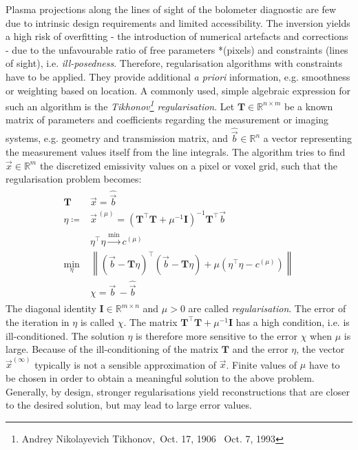                 Plasma projections along the lines of sight of the bolometer diagnostic are few due to intrinsic design requirements and limited accessibility. The inversion yields a high risk of overfitting - the introduction of numerical artefacts and corrections - due to the unfavourable ratio of free parameters *(pixels) and constraints (lines of sight), i.e. \textit{ill-posedness}. Therefore, regularisation algorithms with constraints have to be applied. They provide additional \textit{a priori} information, e.g. smoothness or weighting based on location\cite{Mlynar2012}. A commonly used, simple algebraic expression for such an algorithm is the \textit{Tikhonov\footnote[3]{Andrey Nikolayevich Tikhonov,~Oct. 17, 1906 \textdagger~Oct. 7, 1993} regularisation}. Let $\mathbf{T}\in\mathbb{R}^{n\times m}$ be a known matrix of parameters and coefficients regarding the measurement or imaging systems, e.g. geometry and transmission matrix, and $\mathrel{\hat{\vec{b}}}\in\mathbb{R}^{n}$ a vector representing the measurement values itself from the line integrals. The algorithm tries to find $\vec{x}\in\mathbb{R}^{m}$ the discretized emissivity values on a pixel or voxel grid, such that the regularisation problem becomes\cite{Calvetti2003}:%
%
                \begin{align}%
                    \begin{split}\label{eq:tikhonov_algo}%
                        \mathbf{T}&\vec{x}=\mathrel{\hat{\vec{b}}}\\%
                        \eta\coloneqq&\vec{x}^{\,\left(\mu\right)}=\left(\mathbf{T}^{\intercal}\mathbf{T}+\mu^{-1}\mathbf{I}\right)^{-1}\mathbf{T}^{\intercal}\vec{b}\\%
                        &\eta^{\intercal}\eta\xrightarrow{\text{min}}c^{\left(\mu\right)}\\%
                        \underset{\eta}{\text{min}}&\left\|\left(\vec{b}-\mathbf{T}\eta\right)^{\intercal}\left(\vec{b}-\mathbf{T}\eta\right)+\mu\left(\eta^{\intercal}\eta-c^{\left(\mu\right)}\right)\right\|\\%
                        &\chi=\vec{b}\,-\mathrel{\hat{\vec{b}}}%
                    \end{split}%
                \end{align}%
%
                The diagonal identity \(\mathbf{I}\in\mathbb{R}^{m\times n}\) and $\mu>0$ are called \textit{regularisation}. The error of the iteration in $\eta$ is called $\chi$. The matrix $\mathbf{T}^{\intercal}\mathbf{T}+\mu^{-1}\mathbf{I}$ has a high condition, i.e. is ill-conditioned. The solution $\eta$ is therefore more sensitive to the error $\chi$ when $\mu$ is large. Because of the ill-conditioning of the matrix $\mathbf{T}$ and the error $\eta$, the vector $\vec{x}^{\left(\infty\right)}$ typically is not a sensible approximation of $\vec{x}$. Finite values of $\mu$ have to be chosen in order to obtain a meaningful solution to the above problem. Generally, by design, stronger regularisations yield reconstructions that are closer to the desired solution, but may lead to large error values\cite{Calvetti2003}.\\%
